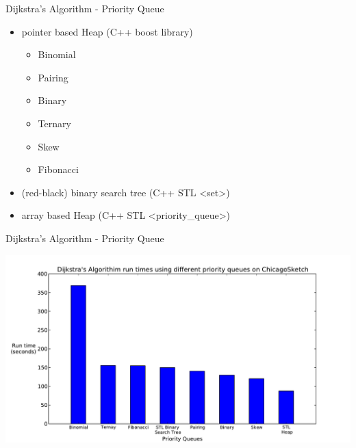 \documentclass{beamer}
\begin{document}
\begin{frame}{Dijkstra's Algorithm - Priority Queue}
    \begin{itemize}
        \item pointer based Heap (C++ boost library)
            \begin{itemize}
                \item Binomial
                \item Pairing
                \item Binary
                \item Ternary
                \item Skew
                \item Fibonacci
            \end{itemize}
        \item (red-black) binary search tree (C++ STL <set>)
        \item array based Heap (C++ STL <priority\_queue>)
    \end{itemize}
\end{frame}

\begin{frame}[shrink]{Dijkstra's Algorithm - Priority Queue}
    \begin{center}
        \includegraphics[width=\paperwidth, height=\paperwidth, keepaspectratio, trim=0 0 0 25pt, clip]{img/pq_runtime}
    \end{center}
\end{frame}
\end{document}
